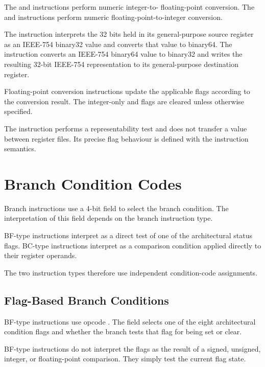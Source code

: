 The  and  instructions perform numeric integer-to-
floating-point conversion. The  and  instructions perform
numeric floating-point-to-integer conversion.

The  instruction interprets the 32 bits held in its general-purpose
source register as an IEEE-754 binary32 value and converts that value to
binary64. The  instruction converts an IEEE-754 binary64 value to
binary32 and writes the resulting 32-bit IEEE-754 representation to its
general-purpose destination register.

Floating-point conversion instructions update the applicable
 flags according to the conversion result. The integer-only
 and  flags are cleared unless otherwise specified.

The  instruction performs a representability test and does not
transfer a value between register files. Its precise flag behaviour is defined
with the instruction semantics.

\section{Branch Condition Codes}

Branch instructions use a 4-bit  field to select the branch
condition. The interpretation of this field depends on the branch instruction
type.

BF-type instructions interpret  as a direct test of one of the
architectural status flags. BC-type instructions interpret  as a
comparison condition applied directly to their register operands.

The two instruction types therefore use independent condition-code
assignments.

\subsection{Flag-Based Branch Conditions}

BF-type instructions use opcode . The  field selects one
of the eight architectural condition flags and whether the branch tests that
flag for being set or clear.

BF-type instructions do not interpret the flags as the result of a signed,
unsigned, integer, or floating-point comparison. They simply test the current
flag state.

